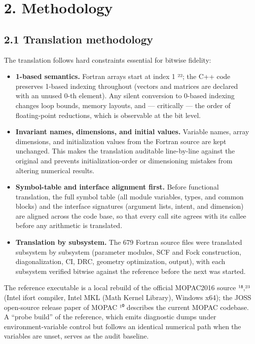 \documentclass[preprint,12pt]{elsarticle}
\begin{document}
\section{2. Methodology}


\subsection{2.1 Translation methodology}
The translation follows hard constraints essential for bitwise fidelity:

\begin{itemize}
\item \textbf{1-based semantics.} Fortran arrays start at index 1 ²²; the C++ code preserves 1-based indexing throughout (vectors and matrices are declared with an unused 0-th element). Any silent conversion to 0-based indexing changes loop bounds, memory layouts, and --- critically --- the order of floating-point reductions, which is observable at the bit level.
\item \textbf{Invariant names, dimensions, and initial values.} Variable names, array dimensions, and initialization values from the Fortran source are kept unchanged. This makes the translation auditable line-by-line against the original and prevents initialization-order or dimensioning mistakes from altering numerical results.
\item \textbf{Symbol-table and interface alignment first.} Before functional translation, the full symbol table (all module variables, types, and common blocks) and the interface signatures (argument lists, intent, and dimension) are aligned across the code base, so that every call site agrees with its callee before any arithmetic is translated.
\item \textbf{Translation by subsystem.} The 679 Fortran source files were translated subsystem by subsystem (parameter modules, SCF and Fock construction, diagonalization, CI, DRC, geometry optimization, output), with each subsystem verified bitwise against the reference before the next was started.
\end{itemize}

The reference executable is a local rebuild of the official MOPAC2016 source ¹⁸,²³ (Intel ifort compiler, Intel MKL (Math Kernel Library), Windows x64); the JOSS open-source release paper of MOPAC ¹⁰ describes the current MOPAC codebase. A ``probe build'' of the reference, which emits diagnostic dumps under environment-variable control but follows an identical numerical path when the variables are unset, serves as the audit baseline.
\end{document}
